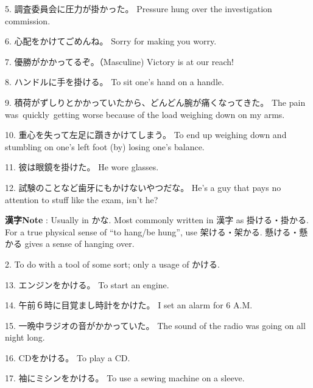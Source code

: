 \par{5. 調査委員会に圧力が掛かった。 \hfill\break
Pressure hung over the investigation commission. }

\par{6. 心配をかけてごめんね。 \hfill\break
Sorry for making you worry. }

\par{7. 優勝がかかってるぞ。（Masculine) \hfill\break
Victory is at our reach! }

\par{8. ハンドルに手を掛ける。 \hfill\break
To sit one's hand on a handle. }

\par{9. 積荷がずしりとかかっていたから、どんどん腕が痛くなってきた。 \hfill\break
The pain was quickly getting worse because of the load weighing down on my arms. }

\par{10. 重心を失って左足に躓きかけてしまう。 \hfill\break
To end up weighing down and stumbling on one's left foot (by) losing one's balance. }

\par{11. 彼は眼鏡を掛けた。 \hfill\break
He wore glasses. }

\par{12. 試験のことなど歯牙にもかけないやつだな。 \hfill\break
He's a guy that pays no attention to stuff like the exam, isn't he? }

\par{\textbf{漢字Note }: Usually in かな. Most commonly written in 漢字 as 掛ける・掛かる. For a true physical sense of “to hang\slash be hung”, use 架ける・架かる. 懸ける・懸かる gives a sense of hanging over. }

\par{2. To do with a tool of some sort; only a usage of かける. }

\par{13. エンジンをかける。 \hfill\break
To start an engine. }

\par{14. 午前６時に目覚まし時計をかけた。 \hfill\break
I set an alarm for 6 A.M. }

\par{15. 一晩中ラジオの音がかかっていた。 \hfill\break
The sound of the radio was going on all night long. }

\par{16. CDをかける。 \hfill\break
To play a CD. }

\par{17. 袖にミシンをかける。 \hfill\break
To use a sewing machine on a sleeve. }

